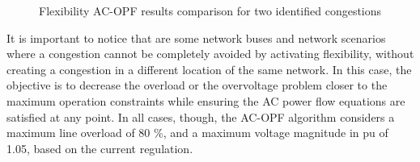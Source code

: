 \begin{figure}[htbp]
\centering     %
{}
\caption{Flexibility AC-OPF results comparison for two identified congestions}
\label{fig:case2_fr}
\end{figure}

It is important to notice that are some network buses and network scenarios where a congestion cannot be completely avoided by activating flexibility, without creating a congestion in a different location of the same network. In this case, the objective is to decrease the overload or the overvoltage problem closer to the maximum operation constraints while ensuring the AC power flow equations are satisfied at any point. In all cases, though, the AC-OPF algorithm considers a maximum line overload of 80 \%, and a maximum voltage magnitude in pu of 1.05, based on the current regulation. 

